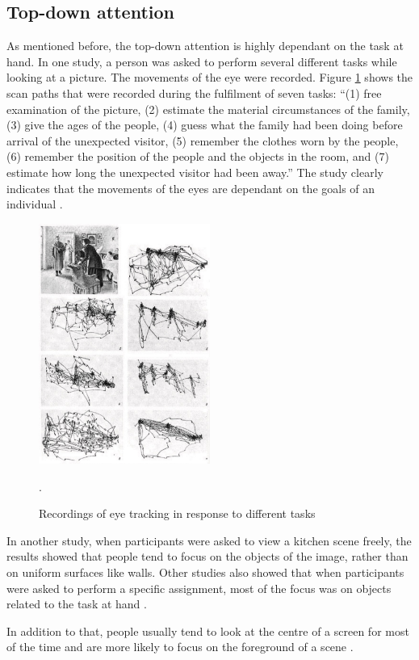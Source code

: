 \subsection{Top-down attention}\label{subsec:topdown_attention}
As mentioned before, the top-down attention is highly dependant on the task at hand. In one study, a person was asked to perform several different tasks while looking at a picture. The movements of the eye were recorded. Figure \ref{fig:eye_movement_recording} shows the scan paths that were recorded during the fulfilment of seven tasks: “(1) free examination of the picture, (2) estimate the material circumstances of the family, (3) give the ages of the people, (4) guess what the family had been doing before arrival of the unexpected visitor, (5) remember the clothes worn by the people, (6) remember the position of the people and the objects in the room, and (7) estimate how long the unexpected visitor had been away.” The study clearly indicates that the movements of the eyes are dependant on the goals of an individual \cite{sundstedt2012gazing}. 

\begin{figure}[h!]
	\centering
	\includegraphics[width=0.5\textwidth]{figures/eye_movement_recording.jpg}
	\caption{Recordings of eye tracking in response to different tasks \cite{sundstedt2012gazing}}.\label{fig:eye_movement_recording}
\end{figure}

In another study, when participants were asked to view a kitchen scene freely, the results showed that people tend to focus on the objects of the image, rather than on uniform surfaces like walls. Other studies also showed that when participants were asked to perform a specific assignment, most of the focus was on objects related to the task at hand \cite{sundstedt2012gazing}. 


In addition to that, people usually tend to look at the centre of a screen for most of the time and are more likely to focus on the foreground of a scene \cite{osberger1998automatic}.

